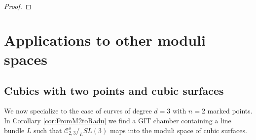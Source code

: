 \documentclass{amsart}
\newcommand{\mc}{\mathcal}
\numberwithin{equation}{section}
\theoremstyle{definition}
\begin{document}
\begin{proof}

\end{proof}



\section{Applications to other moduli spaces} \label{sec:app}

\subsection{Cubics with  two points and cubic surfaces} \label{sec:2pts}

We now specialize to the case of curves of degree $d=3$ with $n=2$ marked points. In Corollary \ref{cor:FromM2toRadu} we find a GIT chamber containing a line bundle $L$ such that $\mc{C}_{2,3}^s \slash_{L} SL(3)$ maps into the moduli space of cubic surfaces.
\end{document}
